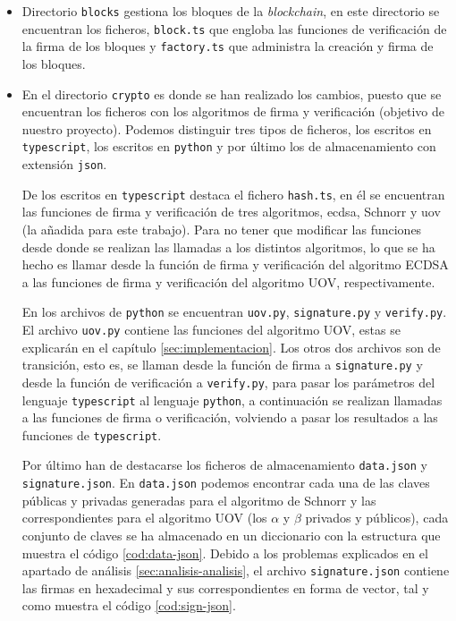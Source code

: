 \begin{itemize}
	\item Directorio \texttt{blocks} gestiona los bloques de la \textit{blockchain}, en este directorio se encuentran los ficheros, \texttt{block.ts} que engloba las funciones de verificación de la firma de los bloques y \texttt{factory.ts} que administra la creación y firma de los bloques.
	\item En el directorio \texttt{crypto} es donde se han realizado los cambios, puesto que se encuentran los ficheros con los algoritmos de firma y verificación (objetivo de nuestro proyecto). Podemos distinguir tres tipos de ficheros, los escritos en \texttt{typescript}, los escritos en \texttt{python} y por último los de almacenamiento con extensión \texttt{json}.
	
	De los escritos en \texttt{typescript} destaca el fichero \texttt{hash.ts}, en él se encuentran las funciones de firma y verificación de tres algoritmos, \acrshort{ecdsa}, Schnorr\cite{schnorr} y \acrshort{uov} (la añadida para este trabajo). Para no tener que modificar las funciones desde donde se realizan las llamadas a los distintos algoritmos, lo que se ha hecho es llamar desde la función de firma y verificación del algoritmo ECDSA a las funciones de firma y verificación del algoritmo UOV, respectivamente.
	
	En los archivos de \texttt{python} se encuentran \texttt{uov.py}, \texttt{signature.py} y \texttt{verify.py}. El archivo \texttt{uov.py} contiene las funciones del algoritmo UOV, estas se explicarán en el capítulo \ref{sec:implementacion}. Los otros dos archivos son de transición, esto es, se llaman desde la función de firma a \texttt{signature.py} y desde la función de verificación a \texttt{verify.py}, para pasar los parámetros del lenguaje \texttt{typescript} al lenguaje \texttt{python}, a continuación se realizan llamadas a las funciones de firma o verificación, volviendo a pasar los resultados a las funciones de \texttt{typescript}.
	
	Por último han de destacarse los ficheros de almacenamiento \texttt{data.json} y \texttt{signature.json}. En \texttt{data.json} podemos encontrar cada una de las claves públicas y privadas generadas para el algoritmo de Schnorr y las correspondientes para el algoritmo UOV (los $\alpha$ y $\beta$ privados y públicos), cada conjunto de claves se ha almacenado en un diccionario con la estructura que muestra el código \ref{cod:data-json}. Debido a los problemas explicados en el apartado de análisis \ref{sec:analisis-analisis}, el archivo \texttt{signature.json} contiene las firmas en hexadecimal y sus correspondientes en forma de vector, tal y como muestra el código \ref{cod:sign-json}.
	

\end{itemize}
